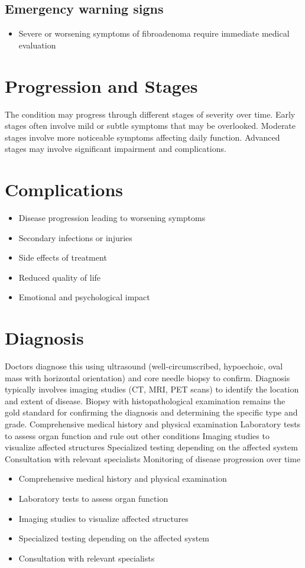 \subsection{Emergency warning signs}
\begin{itemize}[noitemsep]
  \item Severe or worsening symptoms of fibroadenoma require immediate medical evaluation
\end{itemize}
\section{Progression and Stages}
The condition may progress through different stages of severity over time. Early stages often involve mild or subtle symptoms that may be overlooked. Moderate stages involve more noticeable symptoms affecting daily function. Advanced stages may involve significant impairment and complications.
\section{Complications}
\begin{itemize}[noitemsep]
  \item Disease progression leading to worsening symptoms
  \item Secondary infections or injuries
  \item Side effects of treatment
  \item Reduced quality of life
  \item Emotional and psychological impact
\end{itemize}
\section{Diagnosis}
Doctors diagnose this using ultrasound (well-circumscribed, hypoechoic, oval mass with horizontal orientation) and core needle biopsy to confirm. Diagnosis typically involves imaging studies (CT, MRI, PET scans) to identify the location and extent of disease. Biopsy with histopathological examination remains the gold standard for confirming the diagnosis and determining the specific type and grade. Comprehensive medical history and physical examination Laboratory tests to assess organ function and rule out other conditions Imaging studies to visualize affected structures Specialized testing depending on the affected system Consultation with relevant specialists Monitoring of disease progression over time

\begin{itemize}[noitemsep]
  \item Comprehensive medical history and physical examination
  \item Laboratory tests to assess organ function
  \item Imaging studies to visualize affected structures
  \item Specialized testing depending on the affected system
  \item Consultation with relevant specialists
\end{itemize}
